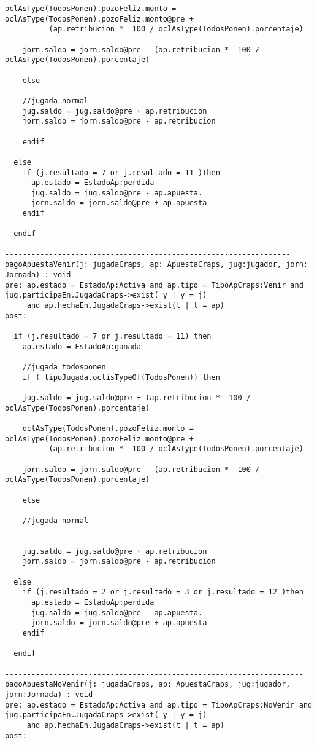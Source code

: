 \begin{framed}
\begin{lstlisting}[breaklines=true]
    oclAsType(TodosPonen).pozoFeliz.monto = oclAsType(TodosPonen).pozoFeliz.monto@pre + 
          (ap.retribucion *  100 / oclAsType(TodosPonen).porcentaje)

    jorn.saldo = jorn.saldo@pre - (ap.retribucion *  100 / oclAsType(TodosPonen).porcentaje)

    else

    //jugada normal
    jug.saldo = jug.saldo@pre + ap.retribucion
    jorn.saldo = jorn.saldo@pre - ap.retribucion

    endif

  else 
    if (j.resultado = 7 or j.resultado = 11 )then
      ap.estado = EstadoAp:perdida
      jug.saldo = jug.saldo@pre - ap.apuesta.
      jorn.saldo = jorn.saldo@pre + ap.apuesta
    endif
  
  endif

-----------------------------------------------------------------
pagoApuestaVenir(j: jugadaCraps, ap: ApuestaCraps, jug:jugador, jorn: Jornada) : void
pre: ap.estado = EstadoAp:Activa and ap.tipo = TipoApCraps:Venir and jug.participaEn.JugadaCraps->exist( y | y = j) 
     and ap.hechaEn.JugadaCraps->exist(t | t = ap)
post:

  if (j.resultado = 7 or j.resultado = 11) then
    ap.estado = EstadoAp:ganada

    //jugada todosponen
    if ( tipoJugada.oclisTypeOf(TodosPonen)) then 
    
    jug.saldo = jug.saldo@pre + (ap.retribucion *  100 / oclAsType(TodosPonen).porcentaje)
    
    oclAsType(TodosPonen).pozoFeliz.monto = oclAsType(TodosPonen).pozoFeliz.monto@pre + 
          (ap.retribucion *  100 / oclAsType(TodosPonen).porcentaje)

    jorn.saldo = jorn.saldo@pre - (ap.retribucion *  100 / oclAsType(TodosPonen).porcentaje)

    else

    //jugada normal


    jug.saldo = jug.saldo@pre + ap.retribucion
    jorn.saldo = jorn.saldo@pre - ap.retribucion

  else 
    if (j.resultado = 2 or j.resultado = 3 or j.resultado = 12 )then
      ap.estado = EstadoAp:perdida
      jug.saldo = jug.saldo@pre - ap.apuesta.
      jorn.saldo = jorn.saldo@pre + ap.apuesta
    endif
  
  endif

--------------------------------------------------------------------
pagoApuestaNoVenir(j: jugadaCraps, ap: ApuestaCraps, jug:jugador, jorn:Jornada) : void
pre: ap.estado = EstadoAp:Activa and ap.tipo = TipoApCraps:NoVenir and jug.participaEn.JugadaCraps->exist( y | y = j) 
     and ap.hechaEn.JugadaCraps->exist(t | t = ap)
post:


\end{lstlisting}
\end{framed}

